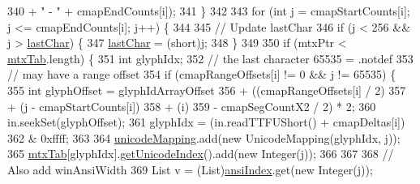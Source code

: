 \begin{DoxyCode}
340                                                          + \textcolor{stringliteral}{" - "} + cmapEndCounts[i]);
341                 \}
342 
343                 \textcolor{keywordflow}{for} (\textcolor{keywordtype}{int} j = cmapStartCounts[i]; j <= cmapEndCounts[i]; j++) \{
344 
345                     \textcolor{comment}{// Update lastChar}
346                     \textcolor{keywordflow}{if} (j < 256 && j > \mbox{\hyperlink{classorg_1_1newdawn_1_1slick_1_1tools_1_1hiero_1_1truetype_1_1_t_t_f_file_a1346d8a5805372eb683a150c38eda75e}{lastChar}}) \{
347                         \mbox{\hyperlink{classorg_1_1newdawn_1_1slick_1_1tools_1_1hiero_1_1truetype_1_1_t_t_f_file_a1346d8a5805372eb683a150c38eda75e}{lastChar}} = (short)j;
348                     \}
349 
350                     \textcolor{keywordflow}{if} (mtxPtr < \mbox{\hyperlink{classorg_1_1newdawn_1_1slick_1_1tools_1_1hiero_1_1truetype_1_1_t_t_f_file_ad78a13682e242fc4a0b5d34a8e5807fa}{mtxTab}}.length) \{
351                         \textcolor{keywordtype}{int} glyphIdx;
352                         \textcolor{comment}{// the last character 65535 = .notdef}
353                         \textcolor{comment}{// may have a range offset}
354                         \textcolor{keywordflow}{if} (cmapRangeOffsets[i] != 0 && j != 65535) \{
355                             \textcolor{keywordtype}{int} glyphOffset = glyphIdArrayOffset
356                                 + ((cmapRangeOffsets[i] / 2)
357                                     + (j - cmapStartCounts[i])
358                                     + (i)
359                                     - cmapSegCountX2 / 2) * 2;
360                             in.seekSet(glyphOffset);
361                             glyphIdx = (in.readTTFUShort() + cmapDeltas[i])
362                                        & 0xffff;
363 
364                             \mbox{\hyperlink{classorg_1_1newdawn_1_1slick_1_1tools_1_1hiero_1_1truetype_1_1_t_t_f_file_a2c9280bb8fa734f8deb6de981a0b4fea}{unicodeMapping}}.add(\textcolor{keyword}{new} UnicodeMapping(glyphIdx, j));
365                             \mbox{\hyperlink{classorg_1_1newdawn_1_1slick_1_1tools_1_1hiero_1_1truetype_1_1_t_t_f_file_ad78a13682e242fc4a0b5d34a8e5807fa}{mtxTab}}[glyphIdx].\mbox{\hyperlink{classorg_1_1newdawn_1_1slick_1_1tools_1_1hiero_1_1truetype_1_1_t_t_f_mtx_entry_a79a6c962b51cadf170541ef839267b87}{getUnicodeIndex}}().add(\textcolor{keyword}{new} Integer(j));
366 
367 
368                             \textcolor{comment}{// Also add winAnsiWidth}
369                             List v = (List)\mbox{\hyperlink{classorg_1_1newdawn_1_1slick_1_1tools_1_1hiero_1_1truetype_1_1_t_t_f_file_a2c884e548a3215ea5c3e3c4ad32f1f73}{ansiIndex}}.get(\textcolor{keyword}{new} Integer(j));

\end{DoxyCode}
